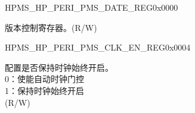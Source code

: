 \begin{register}{H}{PMS\_HP\_PERI\_PMS\_DATE\_REG}{0x0000}\label{regdesc:PMSHPPERIPMSDATEREG}
%
\regnewline%
\begin{regdesc}\begin{reglist}
\label{fielddesc:PMSHPPERIPMSDATE}\item [PMS\_HP\_PERI\_PMS\_DATE] 版本控制寄存器。(R/W)
\end{reglist}\end{regdesc}
\end{register}


\begin{register}{H}{PMS\_HP\_PERI\_PMS\_CLK\_EN\_REG}{0x0004}\label{regdesc:PMSHPPERIPMSCLKENREG}
%
%
\regnewline%
\begin{regdesc}\begin{reglist}
\label{fielddesc:PMSHPPERIPMSCLKEN}\item [PMS\_HP\_PERI\_PMS\_CLK\_EN] 配置是否保持时钟始终开启。\\
0：使能自动时钟门控 \\
1：保持时钟始终开启 \\
(R/W)
\end{reglist}\end{regdesc}
\end{register}


